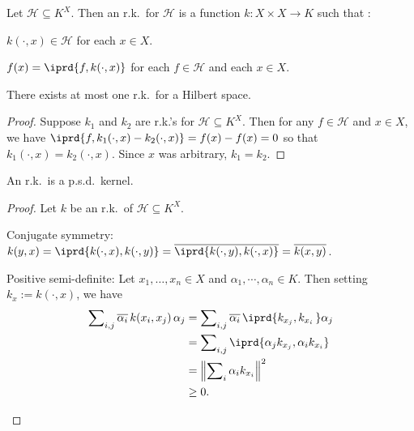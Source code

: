	\begin{dfn}
		Let $\mathscr H\subseteq K^X$. Then an r.k.\ for $\mathscr H$ is a function $k\colon X\times X\to K$ such that \tfh:
		\begin{mylist}
			\item $k(\cdot, x)\in\mathscr H$ for each $x\in X$.
			\item {} $f(x) = \iprd{f, k(\cdot, x)}$ for each $f\in\mathscr H$ and each $x\in X$.
		\end{mylist}
	\end{dfn}
	
	
	\begin{cor}
		There exists at most one r.k.\ for a Hilbert space.
	\end{cor}
	
	\begin{proof}
		Suppose $k_1$ and $k_2$ are r.k.'s for $\mathscr H\subseteq K^X$. Then for any $f\in \mathscr H$ and $x\in X$, we have $\iprd{f, k_1(\cdot, x) - k_2(\cdot, x)} = f(x) - f(x) = 0$ so that $k_1(\cdot, x) = k_2(\cdot, x)$. Since $x$ was arbitrary, $k_1 = k_2$.
	\end{proof}
	
	
	\begin{cor}
		An r.k.\ is a p.s.d.\ kernel.
	\end{cor}
	
	\begin{proof}
		Let $k$ be an r.k.\ of $\mathscr H\subseteq K^X$.
		\begin{prooflist}
			\item Conjugate symmetry: $k(y, x) = \iprd{k(\cdot, x), k(\cdot, y)} = \overline{\iprd{k(\cdot, y), k(\cdot, x)}} = \overline{k(x, y)}$.
			
			\item Positive semi-definite: Let $x_1, \ldots, x_n\in X$ and $\alpha_1, \cdots, \alpha_n\in K$. Then setting $k_x := k(\cdot, x)$, we have
			\begin{align*}
				\sum\nolimits_{i, j} \overline{\alpha_i}\, k(x_i, x_j)\, \alpha_j 
				& = \sum\nolimits_{i, j} \overline{\alpha_i}\, \iprd{ k_{x_j}, k_{x_i}\, } \alpha_j\\
				& = \sum\nolimits_{i, j} \iprd{\alpha_j k_{x_j}, \alpha_i k_{x_i}}\\
				& = \left\Vert \sum\nolimits_i \alpha_i k_{x_i} \right\Vert^2\\
				& \ge 0\text.\qedhere
			\end{align*}
		\end{prooflist}
	\end{proof}
	
